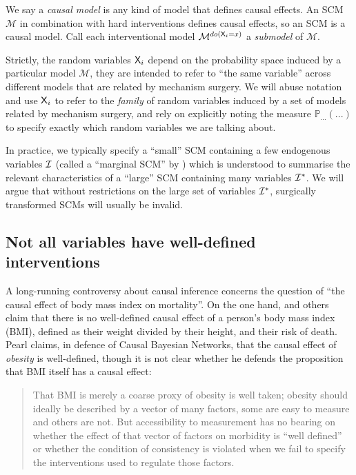 We say a \emph{causal model} is any kind of model that defines causal effects. An SCM $\mathcal{M}$ in combination with hard interventions defines causal effects, so an SCM is a causal model. Call each interventional model $\mathcal{M}^{do(\mathsf{X}_i=x)}$ a \emph{submodel} of $\mathcal{M}$.

Strictly, the random variables $\mathsf{X}_i$ depend on the probability space induced by a particular model $\mathcal{M}$, they are intended to refer to ``the same variable'' across different models that are related by mechanism surgery. We will abuse notation and use $\mathsf{X}_i$ to refer to the \emph{family} of random variables induced by a set of models related by mechanism surgery, and rely on explicitly noting the measure $\mathbb{P}_{...}(...)$ to specify exactly which random variables we are talking about. 

In practice, we typically specify a ``small'' SCM containing a few endogenous variables $\mathcal{I}$ (called a ``marginal SCM'' by \citet{bongers_theoretical_2016}) which is understood to summarise the relevant characteristics of a ``large'' SCM containing many variables $\mathcal{I}^*$. We will argue that without restrictions on the large set of variables $\mathcal{I}^*$, surgically transformed SCMs will usually be invalid.


\subsection{Not all variables have well-defined interventions}

A long-running controversy about causal inference concerns the question of ``the causal effect of body mass index on mortality''. On the one hand, \citet{hernan_does_2008} and others claim that there is no well-defined causal effect of a person's body mass index (BMI), defined as their weight divided by their height, and their risk of death. Pearl claims, in defence of Causal Bayesian Networks, that the causal effect of \emph{obesity} is well-defined, though it is not clear whether he defends the proposition that BMI itself has a causal effect:

\begin{quote}
That BMI is merely a coarse proxy of obesity is well taken; obesity should ideally be described by a vector of many factors, some are easy to measure and others are not. But accessibility to measurement has no bearing on whether the effect of that vector of factors on morbidity is ``well defined'' or whether the condition of consistency is violated when we fail to specify the interventions used to regulate those factors. \citep{pearl_does_2018}
\end{quote}


